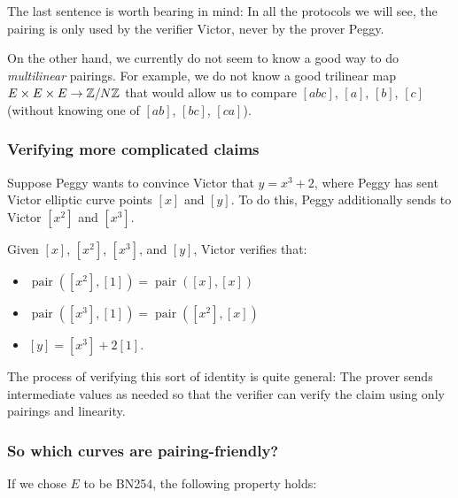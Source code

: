 \begin{remark}
The last sentence is worth bearing in mind: In all the protocols we will see,
the pairing is only used by the verifier Victor, never by the prover Peggy.
\end{remark}

\begin{remark}
On the other hand, we currently do not seem to know a good
way to do \emph{multilinear} pairings.
For example, we do not know a good trilinear map
$E \times E \times E \rightarrow \mathbb{Z} / N \mathbb{Z}$
that would allow us to compare $[a b c]$, $[a]$, $[b]$, $[c]$
(without knowing one of $[a b]$, $[b c]$, $[c a]$).
\end{remark}

\subsubsection{Verifying more complicated claims}\label{pair-verify}

\begin{example}
Suppose Peggy wants to convince Victor that \(y = x^{3} + 2\), where
Peggy has sent Victor elliptic curve points \([ x]\) and
\([ y]\). To do this, Peggy additionally sends to Victor
\(\left[ x^{2} \right]\) and
\(\left[ x^{3} \right]\).

Given \([ x]\), \(\left[ x^{2} \right]\),
\(\left[ x^{3} \right]\), and \([ y]\), Victor
verifies that:

\begin{itemize}
\item
  \(\operatorname{pair}(\left[ x^{2} \right],[ 1]) = \operatorname{pair}([ x],[ x])\)
\item
  \(\operatorname{pair}(\left[ x^{3} \right],[ 1]) = \operatorname{pair}(\left[ x^{2} \right],[ x])\)
\item
  \([ y] = \left[ x^{3} \right] + 2[ 1]\).
\end{itemize}

The process of verifying this sort of identity is quite general: The
prover sends intermediate values as needed so that the verifier can
verify the claim using only pairings and linearity.
\end{example}

\subsubsection{So which curves are
pairing-friendly?}\label{pairing-friendly}

If we chose \(E\) to be BN254, the following property holds:

